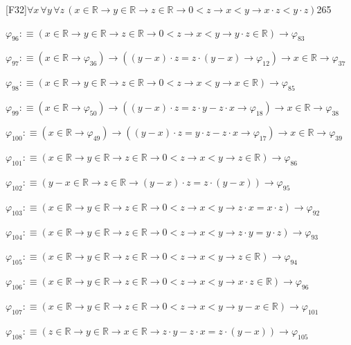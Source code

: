\begin{fullproof}{[F32]}{$\forall x\,\forall y\,\forall z\,(x \in \mathbb{R} \to y \in \mathbb{R} \to z \in \mathbb{R} \to 0 < z \to x < y \to x \cdot z < y \cdot z)$}{265}
\begin{abbrevlist}
\item $\varphi_{96} :\equiv (x \in \mathbb{R} \to y \in \mathbb{R} \to z \in \mathbb{R} \to 0 < z \to x < y \to y \cdot z \in \mathbb{R}) \to \varphi_{83}$
\item $\varphi_{97} :\equiv (x \in \mathbb{R} \to \varphi_{36}) \to ((y - x) \cdot z = z \cdot (y - x) \to \varphi_{12}) \to x \in \mathbb{R} \to \varphi_{37}$
\item $\varphi_{98} :\equiv (x \in \mathbb{R} \to y \in \mathbb{R} \to z \in \mathbb{R} \to 0 < z \to x < y \to x \in \mathbb{R}) \to \varphi_{85}$
\item $\varphi_{99} :\equiv (x \in \mathbb{R} \to \varphi_{50}) \to ((y - x) \cdot z = z \cdot y - z \cdot x \to \varphi_{18}) \to x \in \mathbb{R} \to \varphi_{38}$
\item $\varphi_{100} :\equiv (x \in \mathbb{R} \to \varphi_{49}) \to ((y - x) \cdot z = y \cdot z - z \cdot x \to \varphi_{17}) \to x \in \mathbb{R} \to \varphi_{39}$
\item $\varphi_{101} :\equiv (x \in \mathbb{R} \to y \in \mathbb{R} \to z \in \mathbb{R} \to 0 < z \to x < y \to z \in \mathbb{R}) \to \varphi_{86}$
\item $\varphi_{102} :\equiv (y - x \in \mathbb{R} \to z \in \mathbb{R} \to (y - x) \cdot z = z \cdot (y - x)) \to \varphi_{95}$
\item $\varphi_{103} :\equiv (x \in \mathbb{R} \to y \in \mathbb{R} \to z \in \mathbb{R} \to 0 < z \to x < y \to z \cdot x = x \cdot z) \to \varphi_{92}$
\item $\varphi_{104} :\equiv (x \in \mathbb{R} \to y \in \mathbb{R} \to z \in \mathbb{R} \to 0 < z \to x < y \to z \cdot y = y \cdot z) \to \varphi_{93}$
\item $\varphi_{105} :\equiv (x \in \mathbb{R} \to y \in \mathbb{R} \to z \in \mathbb{R} \to 0 < z \to x < y \to z \in \mathbb{R}) \to \varphi_{94}$
\item $\varphi_{106} :\equiv (x \in \mathbb{R} \to y \in \mathbb{R} \to z \in \mathbb{R} \to 0 < z \to x < y \to x \cdot z \in \mathbb{R}) \to \varphi_{96}$
\item $\varphi_{107} :\equiv (x \in \mathbb{R} \to y \in \mathbb{R} \to z \in \mathbb{R} \to 0 < z \to x < y \to y - x \in \mathbb{R}) \to \varphi_{101}$
\item $\varphi_{108} :\equiv (z \in \mathbb{R} \to y \in \mathbb{R} \to x \in \mathbb{R} \to z \cdot y - z \cdot x = z \cdot (y - x)) \to \varphi_{105}$
\end{abbrevlist}
\end{fullproof}
